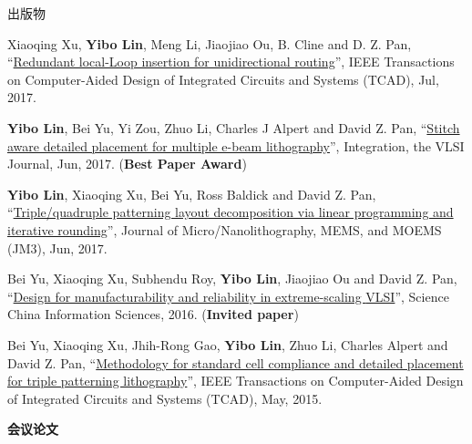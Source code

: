 \begin{rSection}{出版物}
\begin{description}[font=\normalfont]
{}
            

\item[{[J5]}]{
        Xiaoqing Xu, \textbf{Yibo Lin}, Meng Li, Jiaojiao Ou,  B. Cline  and  D. Z. Pan, 
    ``\href{http://dx.doi.org/10.1109/TCAD.2017.2651811}{Redundant local-Loop insertion for unidirectional routing}'', 
    IEEE Transactions on Computer-Aided Design of Integrated Circuits and Systems (TCAD), Jul, 2017.
    
}
            

\item[{[J4]}]{
        \textbf{Yibo Lin}, Bei Yu, Yi Zou, Zhuo Li, Charles J Alpert and David Z. Pan, 
    ``\href{http://dx.doi.org/10.1016/j.vlsi.2017.02.004}{Stitch aware detailed placement for multiple e-beam lithography}'', 
    Integration, the VLSI Journal, Jun, 2017.
    (\textbf{Best Paper Award})
}
            

\item[{[J3]}]{
        \textbf{Yibo Lin}, Xiaoqing Xu, Bei Yu, Ross Baldick and David Z. Pan, 
    ``\href{http://dx.doi.org/10.1117/1.JMM.16.2.023507}{Triple/quadruple patterning layout decomposition via linear programming and iterative rounding}'', 
    Journal of Micro/Nanolithography, MEMS, and MOEMS (JM3), Jun, 2017.
    
}
            

\item[{[J2]}]{
        Bei Yu, Xiaoqing Xu, Subhendu Roy, \textbf{Yibo Lin}, Jiaojiao Ou and David Z. Pan, 
    ``\href{http://link.springer.com/article/10.1007%2Fs11432-016-5560-6}{Design for manufacturability and reliability in extreme-scaling {VLSI}}'', 
    Science China Information Sciences, 2016.
    (\textbf{Invited paper})
}
            

\item[{[J1]}]{
        Bei Yu, Xiaoqing Xu, Jhih-Rong Gao, \textbf{Yibo Lin}, Zhuo Li, Charles Alpert and David Z. Pan, 
    ``\href{https://doi.org/10.1109/TCAD.2015.2401571}{Methodology for standard cell compliance and detailed placement for triple patterning lithography}'', 
    IEEE Transactions on Computer-Aided Design of Integrated Circuits and Systems (TCAD), May, 2015.
    
}
            

\end{description}
    

\textbf{会议论文}
        

\begin{description}[font=\normalfont]
    


\end{description}
\end{rSection}
